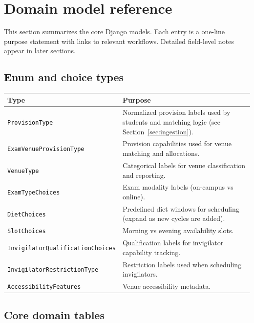 \section{Domain model reference}
\label{sec:models}

This section summarizes the core Django models. Each entry is a one-line purpose statement with links to relevant workflows. Detailed field-level notes appear in later sections.

\subsection{Enum and choice types}
\label{subsec:models:enums}

\begin{longtable}{p{}p{}}
\toprule
\textbf{Type} & \textbf{Purpose} \\
\midrule
\texttt{ProvisionType} & Normalized provision labels used by students and matching logic (see Section~\ref{sec:ingestion}). \\
\texttt{ExamVenueProvisionType} & Provision capabilities used for venue matching and allocations. \\
\texttt{VenueType} & Categorical labels for venue classification and reporting. \\
\texttt{ExamTypeChoices} & Exam modality labels (on-campus vs online). \\
\texttt{DietChoices} & Predefined diet windows for scheduling (expand as new cycles are added). \\
\texttt{SlotChoices} & Morning vs evening availability slots. \\
\texttt{InvigilatorQualificationChoices} & Qualification labels for invigilator capability tracking. \\
\texttt{InvigilatorRestrictionType} & Restriction labels used when scheduling invigilators. \\
\texttt{AccessibilityFeatures} & Venue accessibility metadata. \\
\bottomrule
\end{longtable}

\subsection{Core domain tables}
\label{subsec:models:core}

